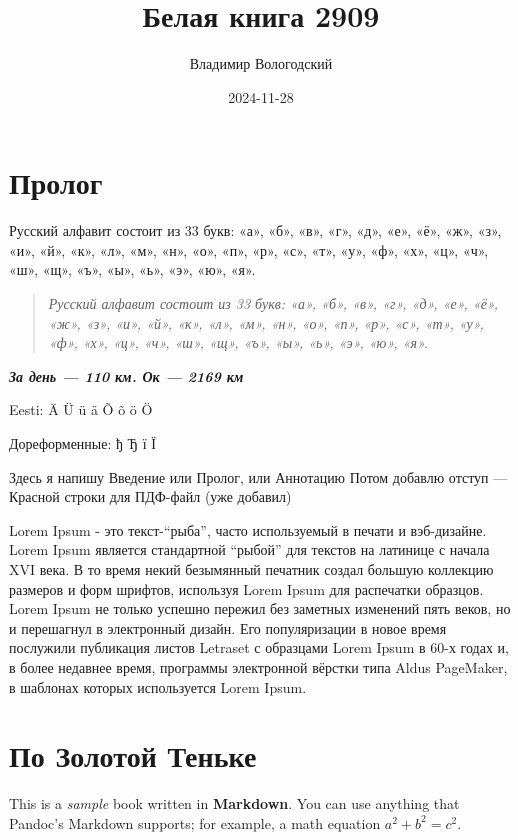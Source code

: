 \documentclass[
  12pt,
  a4paper,
]{book}
\title{Белая книга 2909}
\author{Владимир Вологодский}
\date{2024-11-28}
\theoremstyle{definition}
\theoremstyle{definition}
\theoremstyle{definition}
\theoremstyle{definition}
\theoremstyle{remark}
\begin{document}
\maketitle

{
\setcounter{tocdepth}{1}
\tableofcontents
}
\chapter*{Пролог}\label{index}

Русский алфавит состоит из 33 букв: «а», «б», «в», «г», «д», «е», «ё», «ж», «з», «и», «й», «к», «л», «м», «н», «о», «п», «р», «с», «т», «у», «ф», «х», «ц», «ч», «ш», «щ», «ъ», «ы», «ь», «э», «ю», «я».

\begin{quote}
\emph{Русский алфавит состоит из 33 букв: «а», «б», «в», «г», «д», «е», «ё», «ж», «з», «и», «й», «к», «л», «м», «н», «о», «п», «р», «с», «т», «у», «ф», «х», «ц», «ч», «ш», «щ», «ъ», «ы», «ь», «э», «ю», «я».}
\end{quote}

\emph{\textbf{За день --- 110 км. Ок --- 2169 км}}

Eesti: Ä Ü ü ä Õ õ ö Ö

Дореформенные: ђ Ђ ї Ї

Здесь я напишу Введение или Пролог, или Аннотацию
Потом добавлю отступ --- Красной строки для ПДФ-файл (уже добавил)

Lorem Ipsum - это текст-``рыба'', часто используемый в печати и вэб-дизайне. Lorem Ipsum является стандартной ``рыбой'' для текстов на латинице с начала XVI века. В то время некий безымянный печатник создал большую коллекцию размеров и форм шрифтов, используя Lorem Ipsum для распечатки образцов. Lorem Ipsum не только успешно пережил без заметных изменений пять веков, но и перешагнул в электронный дизайн. Его популяризации в новое время послужили публикация листов Letraset с образцами Lorem Ipsum в 60-х годах и, в более недавнее время, программы электронной вёрстки типа Aldus PageMaker, в шаблонах которых используется Lorem Ipsum.

\chapter{По Золотой Теньке}\label{about}

This is a \emph{sample} book written in \textbf{Markdown}. You can use anything that Pandoc's Markdown supports; for example, a math equation \(a^2 + b^2 = c^2\).
\end{document}

